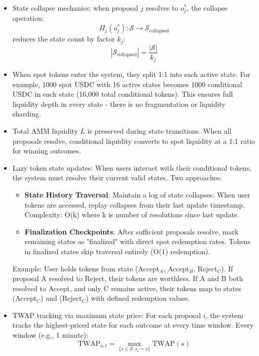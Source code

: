 \documentclass{article}
\begin{document}
\begin{itemize}
    \item State collapse mechanics: when proposal $j$ resolves to $o_j^*$, the collapse operation:
    \begin{equation}
    \Pi_j(o_j^*): \mathcal{S} \rightarrow \mathcal{S}_{\text{collapsed}}
    \end{equation}
    reduces the state count by factor $k_j$:
    \begin{equation}
    |\mathcal{S}_{\text{collapsed}}| = \frac{|\mathcal{S}|}{k_j}
    \end{equation}

    \item When spot tokens enter the system, they split 1:1 into each active state. For example, 1000 spot USDC with 16 active states becomes 1000 conditional USDC in each state (16,000 total conditional tokens). This ensures full liquidity depth in every state - there is no fragmentation or liquidity sharding.
    
    \item Total AMM liquidity $L$ is preserved during state transitions. 
    When all proposals resolve, conditional liquidity converts to spot liquidity at a 1:1 ratio for winning outcomes.
    
    \item Lazy token state updates: When users interact with their conditional tokens, the system must resolve their current valid states. Two approaches:
    \begin{itemize}
        \item \textbf{State History Traversal}: Maintain a log of state collapses. When user tokens are accessed, replay collapses from their last update timestamp. Complexity: O(k) where k is number of resolutions since last update.
        \item \textbf{Finalization Checkpoints}: After sufficient proposals resolve, mark remaining states as "finalized" with direct spot redemption rates. Tokens in finalized states skip traversal entirely (O(1) redemption).
        \end{itemize}
        Example: User holds tokens from state (Accept$_A$, Accept$_B$, Reject$_C$). If proposal A resolved to Reject, their tokens are worthless. If A and B both resolved to Accept, and only C remains active, their tokens map to states (Accept$_C$) and (Reject$_C$) with defined redemption values.

        \item TWAP tracking via maximum state price: For each proposal $i$, the system tracks the highest-priced state for each outcome at every time window. Every window (e.g., 1 minute):
        \begin{equation}
        \text{TWAP}_{o,t} = \max_{\{s \in \mathcal{S} : s_i = o\}} \text{TWAP}(s)
        \end{equation}
        

\end{itemize}
\end{document}
